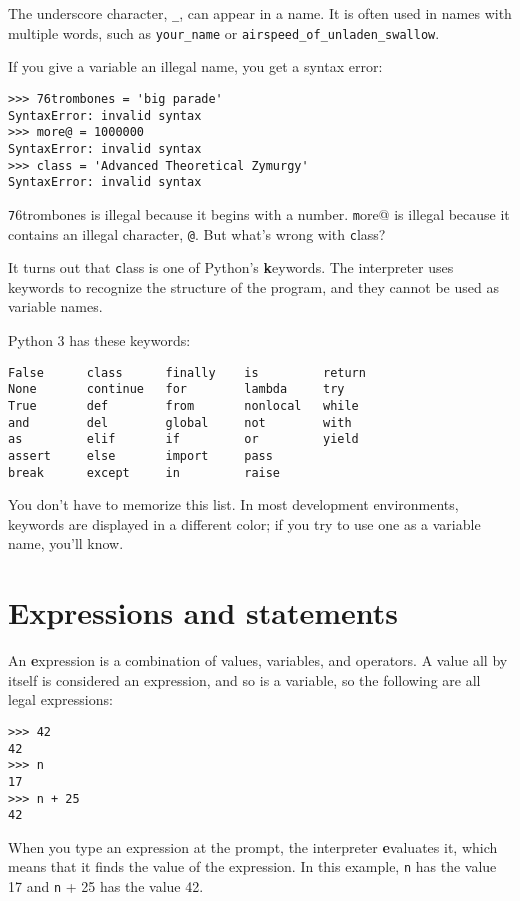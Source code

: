 \documentclass[
DIV=11,
fontsize=12,
twoside,
headinclude=false,
titlepage=firstiscover,
abstract=true,
headsepline=true,
footsepline=true,
chapterprefix=true, %
headings=big,
bibliography=totoc,%
captions=tableheading
]{scrbook}
\theoremstyle{definition}
\begin{document}
The underscore character, \verb"_", can appear in a name.
It is often used in names with multiple words, such as
\verb"your_name" or \verb"airspeed_of_unladen_swallow".

If you give a variable an illegal name, you get a syntax error:

\begin{lstlisting}
>>> 76trombones = 'big parade'
SyntaxError: invalid syntax
>>> more@ = 1000000
SyntaxError: invalid syntax
>>> class = 'Advanced Theoretical Zymurgy'
SyntaxError: invalid syntax
\end{lstlisting}
%
{\texttt 76trombones} is illegal because it begins with a number.
{\texttt more@} is illegal because it contains an illegal character, {\texttt
@}.  But what's wrong with {\texttt class}?

It turns out that {\texttt class} is one of Python's {\textbf keywords}.  The
interpreter uses keywords to recognize the structure of the program,
and they cannot be used as variable names.

Python 3 has these keywords:

\begin{lstlisting}
False      class      finally    is         return
None       continue   for        lambda     try
True       def        from       nonlocal   while
and        del        global     not        with
as         elif       if         or         yield
assert     else       import     pass
break      except     in         raise
\end{lstlisting}
%
You don't have to memorize this list.  In most development environments,
keywords are displayed in a different color; if you try to use one
as a variable name, you'll know.


\section{Expressions and statements}

An {\textbf expression} is a combination of values, variables, and operators.
A value all by itself is considered an expression, and so is
a variable, so the following are all legal expressions:

\begin{lstlisting}
>>> 42
42
>>> n
17
>>> n + 25
42
\end{lstlisting}
%
When you type an expression at the prompt, the interpreter
{\textbf evaluates} it, which means that it finds the value of
the expression.
In this example, {\texttt n} has the value 17 and
{\texttt n + 25} has the value 42.
\end{document}

